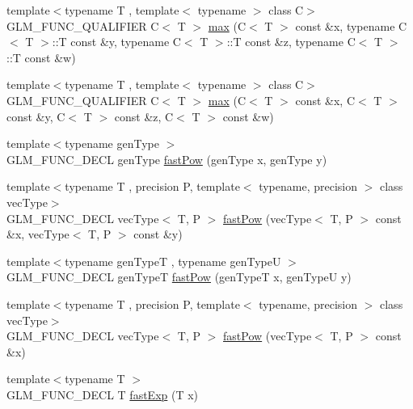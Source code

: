 \begin{DoxyCompactItemize}
\item 
{\footnotesize template$<$typename T , template$<$ typename $>$ class C$>$ }\\G\+L\+M\+\_\+\+F\+U\+N\+C\+\_\+\+Q\+U\+A\+L\+I\+F\+I\+E\+R C$<$ T $>$ \hyperlink{group__gtx__extented__min__max_ga7cca8b53cfda402040494cdf40fbdf4a}{max} (C$<$ T $>$ const \&x, typename C$<$ T $>$\+::T const \&y, typename C$<$ T $>$\+::T const \&z, typename C$<$ T $>$\+::T const \&w)
\item 
{\footnotesize template$<$typename T , template$<$ typename $>$ class C$>$ }\\G\+L\+M\+\_\+\+F\+U\+N\+C\+\_\+\+Q\+U\+A\+L\+I\+F\+I\+E\+R C$<$ T $>$ \hyperlink{group__gtx__extented__min__max_gaacffbc466c2d08c140b181e7fd8a4858}{max} (C$<$ T $>$ const \&x, C$<$ T $>$ const \&y, C$<$ T $>$ const \&z, C$<$ T $>$ const \&w)
\item 
{\footnotesize template$<$typename gen\+Type $>$ }\\G\+L\+M\+\_\+\+F\+U\+N\+C\+\_\+\+D\+E\+C\+L gen\+Type \hyperlink{group__gtx__fast__exponential_ga5340e98a11fcbbd936ba6e983a154d50}{fast\+Pow} (gen\+Type x, gen\+Type y)
\item 
{\footnotesize template$<$typename T , precision P, template$<$ typename, precision $>$ class vec\+Type$>$ }\\G\+L\+M\+\_\+\+F\+U\+N\+C\+\_\+\+D\+E\+C\+L vec\+Type$<$ T, P $>$ \hyperlink{group__gtx__fast__exponential_ga07b73976a9af4005945bc338b45d8466}{fast\+Pow} (vec\+Type$<$ T, P $>$ const \&x, vec\+Type$<$ T, P $>$ const \&y)
\item 
{\footnotesize template$<$typename gen\+Type\+T , typename gen\+Type\+U $>$ }\\G\+L\+M\+\_\+\+F\+U\+N\+C\+\_\+\+D\+E\+C\+L gen\+Type\+T \hyperlink{group__gtx__fast__exponential_ga7f2562db9c3e02ae76169c36b086c3f6}{fast\+Pow} (gen\+Type\+T x, gen\+Type\+U y)
\item 
{\footnotesize template$<$typename T , precision P, template$<$ typename, precision $>$ class vec\+Type$>$ }\\G\+L\+M\+\_\+\+F\+U\+N\+C\+\_\+\+D\+E\+C\+L vec\+Type$<$ T, P $>$ \hyperlink{group__gtx__fast__exponential_ga29924aea1aa11c5c504fb2d621221906}{fast\+Pow} (vec\+Type$<$ T, P $>$ const \&x)
\item 
{\footnotesize template$<$typename T $>$ }\\G\+L\+M\+\_\+\+F\+U\+N\+C\+\_\+\+D\+E\+C\+L T \hyperlink{group__gtx__fast__exponential_gaa3180ac8f96ab37ab96e0cacaf608e10}{fast\+Exp} (T x)
\item 

\end{DoxyCompactItemize}
